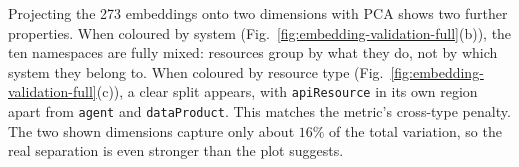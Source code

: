 Projecting the 273 embeddings onto two dimensions with PCA shows two further properties. When coloured by system (Fig.~\ref{fig:embedding-validation-full}(b)), the ten namespaces are fully mixed: resources group by what they do, not by which system they belong to. When coloured by resource type (Fig.~\ref{fig:embedding-validation-full}(c)), a clear split appears, with \texttt{apiResource} in its own region apart from \texttt{agent} and \texttt{dataProduct}. This matches the metric's cross-type penalty. The two shown dimensions capture only about $16\%$ of the total variation, so the real separation is even stronger than the plot suggests.



